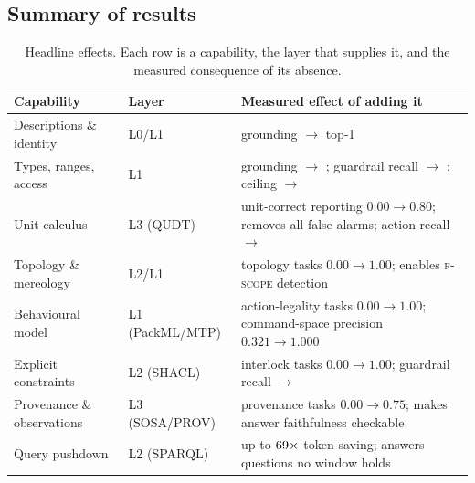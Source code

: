 \subsection{Summary of results}

\begin{table}[t]
\centering
\caption{Headline effects. Each row is a capability, the layer that supplies it,
and the measured consequence of its absence.}
\label{tab:headline}
\footnotesize
\setlength{\tabcolsep}{4pt}
\begin{tabular}{@{}L{3.6cm}L{2.6cm}L{9.0cm}@{}}
\toprule
\textbf{Capability} & \textbf{Layer} & \textbf{Measured effect of adding it} \\
\midrule
Descriptions \& identity & L0/L1 & grounding \GrndTopOneCZero{} $\to$
\GrndTopOneCOne{} top-1 \\
Types, ranges, access & L1 & grounding $\to$ \GrndTopOneCTwo{}; guardrail recall
$\to$ \RecallGTwo{}; ceiling $\to$ \CeilingCTwo{} \\
Unit calculus & L3 (QUDT) & unit-correct reporting $0.00 \to 0.80$; removes all
\FPRGTwo{} false alarms; action recall \ActRecGTwo{} $\to$ \ActRecGThree{} \\
Topology \& mereology & L2/L1 & topology tasks $0.00 \to 1.00$; enables
\textsc{f-scope} detection \\
Behavioural model & L1 (PackML/MTP) & action-legality tasks $0.00 \to 1.00$;
command-space precision $0.321 \to 1.000$ \\
Explicit constraints & L2 (SHACL) & interlock tasks $0.00 \to 1.00$; guardrail
recall $\to$ \RecallGFour{} \\
Provenance \& observations & L3 (SOSA/PROV) & provenance tasks $0.00 \to 0.75$;
makes answer faithfulness checkable \\
Query pushdown & L2 (SPARQL) & up to $69\times$ token saving;
answers questions no window holds \\
\bottomrule
\end{tabular}
\end{table}
